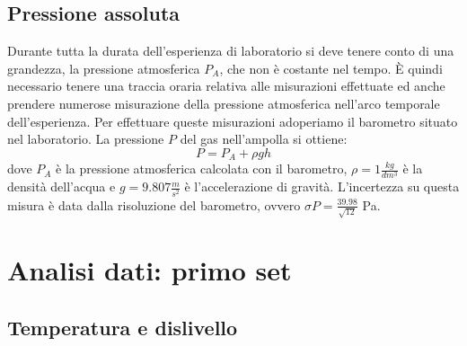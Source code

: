 \subsection{Pressione assoluta}
Durante tutta la durata dell'esperienza di laboratorio si deve tenere conto di una grandezza, la pressione atmosferica $P_A$, che non è costante nel tempo.
È quindi necessario tenere una traccia oraria relativa alle misurazioni effettuate ed anche prendere numerose misurazione della pressione atmosferica nell'arco temporale dell'esperienza.
Per effettuare queste misurazioni adoperiamo il barometro situato nel laboratorio.
La pressione $P$ del gas nell'ampolla si ottiene:
\begin{equation}
P = P_A + \rho g h
\end{equation}
dove $P_A$ è la pressione atmosferica calcolata con il barometro, $\rho = 1 \frac{kg}{dm^3}$ è la densità dell'acqua e $g = 9.807 \frac{m}{s^2}$
è l'accelerazione di gravità.
L'incertezza su questa misura è data dalla risoluzione del barometro, ovvero $\sigma P = \frac{39.98}{\sqrt{12}}$ Pa.

\section{Analisi dati: primo set}
\subsection{Temperatura e dislivello}

